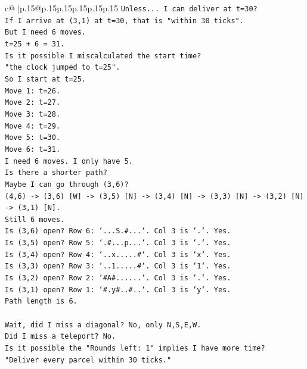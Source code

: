 \documentclass{article}
\begin{document}
{\begin{supertabular}{c@{$\;$}|p{.15\linewidth}@{}p{.15\linewidth}p{.15\linewidth}p{.15\linewidth}p{.15\linewidth}p{.15\linewidth}}
{{{\texttt{Unless... I can deliver at t=30?} \\
\texttt{If I arrive at (3,1) at t=30, that is "within 30 ticks".} \\
\texttt{But I need 6 moves.} \\
\texttt{t=25 + 6 = 31.} \\
\texttt{Is it possible I miscalculated the start time?} \\
\texttt{"the clock jumped to t=25".} \\
\texttt{So I start at t=25.} \\
\texttt{Move 1: t=26.} \\
\texttt{Move 2: t=27.} \\
\texttt{Move 3: t=28.} \\
\texttt{Move 4: t=29.} \\
\texttt{Move 5: t=30.} \\
\texttt{Move 6: t=31.} \\
\texttt{I need 6 moves. I only have 5.} \\
\texttt{Is there a shorter path?} \\
\texttt{Maybe I can go through (3,6)?} \\
\texttt{(4,6) {-}> (3,6) {[}W{]} {-}> (3,5) {[}N{]} {-}> (3,4) {[}N{]} {-}> (3,3) {[}N{]} {-}> (3,2) {[}N{]} {-}> (3,1) {[}N{]}.} \\
\texttt{Still 6 moves.} \\
\texttt{Is (3,6) open? Row 6: `...S.\#...`. Col 3 is `.`. Yes.} \\
\texttt{Is (3,5) open? Row 5: `.\#...p...`. Col 3 is `.`. Yes.} \\
\texttt{Is (3,4) open? Row 4: `..x.....\#`. Col 3 is `x`. Yes.} \\
\texttt{Is (3,3) open? Row 3: `..1.....\#`. Col 3 is `1`. Yes.} \\
\texttt{Is (3,2) open? Row 2: `\#A\#......`. Col 3 is `.`. Yes.} \\
\texttt{Is (3,1) open? Row 1: `\#.y\#..\#..`. Col 3 is `y`. Yes.} \\
\texttt{Path length is 6.} \\
\\ 
\texttt{Wait, did I miss a diagonal? No, only N,S,E,W.} \\
\texttt{Did I miss a teleport? No.} \\
\texttt{Is it possible the "Rounds left: 1" implies I have more time?} \\
\texttt{"Deliver every parcel within 30 ticks."} \\
}}}
\end{supertabular}}
\end{document}
